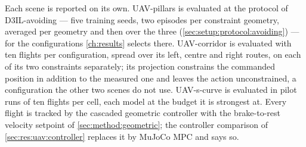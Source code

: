 
Each scene is reported on its own. UAV-pillars is evaluated at the protocol of D3IL-avoiding --- five
training seeds, two episodes per constraint geometry, averaged per geometry and then over the three
(\autoref{sec:setup:protocol:avoiding}) --- for the configurations \autoref{ch:results} selects there. UAV-corridor is evaluated with ten flights per configuration, spread
over its left, centre and right routes, on each of its two constraints separately; its projection constrains the commanded position in addition to the measured one and leaves the
action unconstrained, a configuration the other two scenes do not use. UAV-s-curve is evaluated in pilot
runs of ten flights per cell, each model at the budget it is strongest at. Every flight is tracked by the
cascaded geometric controller with the brake-to-rest velocity setpoint of \autoref{sec:method:geometric};
the controller comparison of \autoref{sec:res:uav:controller} replaces it by MuJoCo MPC and says so.
